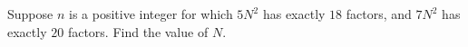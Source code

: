 Suppose $n$ is a positive integer for which $5N^2$ has exactly $18$ factors, and $7N^2$ has exactly $20$ factors. Find the value of $N$.

